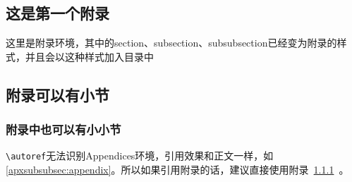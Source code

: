 \documentclass[supercite]{HustGraduTrans}
\begin{document}
    \begin{appendices}
        \section{这是第一个附录}
        这里是附录环境，其中的section、subsection、subsubsection已经变为附录的样式，并且会以这种样式加入目录中
        \subsection{附录可以有小节}
        \subsubsection{附录中也可以有小小节}\label{apxsubsubsec:appendix}
        \verb|\autoref|无法识别Appendices环境，引用效果和正文一样，如\autoref{apxsubsubsec:appendix}。所以如果引用附录的话，建议直接使用附录~\ref{apxsubsubsec:appendix}~。
    \end{appendices}
\end{document}

